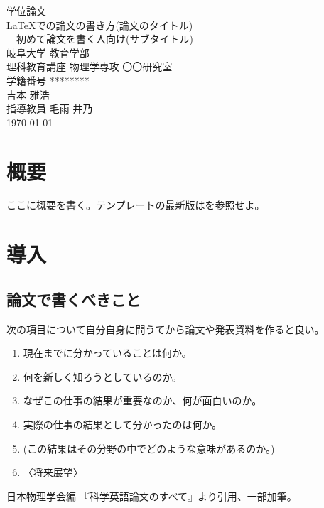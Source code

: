 \documentclass[a4j,openany,11px]{jsbook}
\begin{document}
\begin{titlepage}
    \centering
    \vspace*{50truept}
    {\huge 学位論文}\\
    \vspace{100truept}
    {\huge \LaTeX での論文の書き方(論文のタイトル)}\\ %
    \vspace{10truept}
    {\LARGE ―初めて論文を書く人向け(サブタイトル)―}\\ %
    \vspace{140truept}
    {\LARGE 岐阜大学 教育学部}\\ %
    \vspace{10truept}
    {\LARGE 理科教育講座 物理学専攻 〇〇研究室}\\ %
    \vspace{20truept}
    {\LARGE 学籍番号 ********}\\ %
    \vspace{20truept}
    {\LARGE 吉本 雅浩}\\ %
    \vspace{50truept}
    {\LARGE 指導教員 毛雨 井乃}\\
    \vspace{50truept}
    {\LARGE \today} %
\end{titlepage}

\thispagestyle{empty} %
\tableofcontents %
\chapter*{概要}

ここに概要を書く。テンプレートの最新版は\cite{tex_sample}を参照せよ。

\chapter{導入}
\section{論文で書くべきこと}
次の項目について自分自身に問うてから論文や発表資料を作ると良い。
\begin{enumerate}
    \item 現在までに分かっていることは何か。
    \item 何を新しく知ろうとしているのか。
    \item なぜこの仕事の結果が重要なのか、何が面白いのか。
    \item 実際の仕事の結果として分かったのは何か。
    \item (この結果はその分野の中でどのような意味があるのか。)
    \item 〈将来展望〉
\end{enumerate}
日本物理学会編 『科学英語論文のすべて』より引用、一部加筆。
\end{document}
